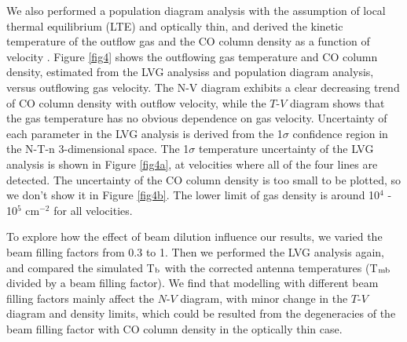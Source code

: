 We also performed a population diagram analysis with the assumption of local thermal equilibrium (LTE) and optically thin, and derived the kinetic temperature of the outflow gas and the CO column density as a function of velocity \citep{1999ApJ...517..209G}. Figure \ref{fig4} shows the outflowing gas temperature and CO column density, estimated from the LVG analysiss and population diagram analysis, versus outflowing gas velocity. The N-V diagram exhibits a clear decreasing trend of CO column density with outflow velocity, while the $T$-$V$ diagram shows that the gas temperature has no obvious dependence on gas velocity. Uncertainty of each parameter in the LVG analysis is derived from the 1$\sigma$ confidence region in the N-T-n 3-dimensional space. The 1$\sigma$ temperature uncertainty of the LVG analysis is shown in Figure \ref{fig4a}, at velocities where all of the four lines are detected. The uncertainty of the CO column density is too small to be plotted, so we don't show it in Figure \ref{fig4b}. The lower limit of gas density is around 10$^4$ - 10$^5$ cm$^{-2}$ for all velocities. 

To explore how the effect of beam dilution influence our results, we varied the beam filling factors from 0.3 to 1. Then we performed the LVG analysis again, and compared the simulated T$_\textup{b}$ with the corrected antenna temperatures (T$_{\textup{mb}}$ divided by a beam filling factor). We find that modelling with different beam filling factors mainly affect the $N$-$V$ diagram, with minor change in the $T$-$V$ diagram and density limits, which could be resulted from the degeneracies of the beam filling factor with CO column density in the optically thin case. 




